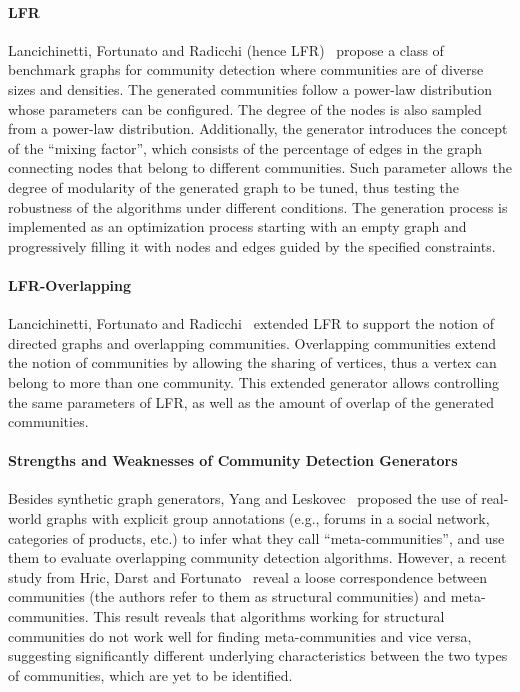 \paragraph{LFR} Lancichinetti, Fortunato
and Radicchi (hence LFR)~\cite{PhysRevE.78.046110} propose a class of benchmark
graphs for community detection where communities are of diverse sizes and
densities. The generated communities follow a power-law distribution whose parameters can be configured. The degree of the
nodes is also sampled from a power-law distribution. Additionally, the generator
introduces the concept of the ``mixing factor'', which consists of the percentage of
edges in the graph connecting nodes that belong to different communities. Such parameter
allows  the degree of modularity of the generated graph  to be tuned, thus
testing the robustness of the algorithms under different conditions. The
generation process is implemented as an optimization process starting with an empty graph and
progressively filling it with nodes and edges guided by the specified constraints.

\paragraph{LFR-Overlapping} Lancichinetti, Fortunato and
Radicchi~\cite{PhysRevE.80.016118} extended LFR to support the notion of
directed graphs and overlapping communities. Overlapping communities extend the
notion of communities by allowing the sharing of vertices, thus a vertex can
belong to more than one community. This extended generator allows controlling
the same parameters of LFR, as well as the amount of overlap of
the generated communities.

\paragraph{Strengths and Weaknesses of Community Detection Generators}
Besides synthetic graph generators, Yang and Leskovec~\cite{yang2015defining}
proposed the use of real-world graphs with explicit group annotations (e.g.,
forums in a social network, categories of products, etc.) to infer what they
call ``meta-communities'', and use them to evaluate overlapping community
detection algorithms. However, a recent study from Hric, Darst and
Fortunato~\cite{hric2014community} reveal a loose correspondence between
communities (the authors refer to them as structural communities) and
meta-communities.  This result reveals that  algorithms working for structural
communities do not work well for finding meta-communities and vice versa,
suggesting significantly different underlying characteristics
between the two types of communities, which are yet to be
identified.

